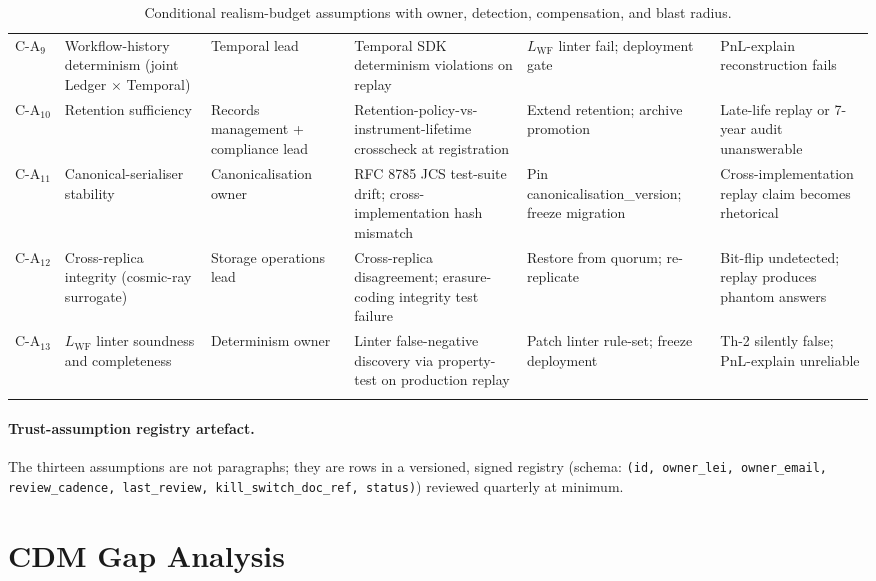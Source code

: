 \documentclass[11pt,a4paper]{article}
\begin{document}
\begin{center}
\begin{longtable}{@{}p{1.2cm}p{3.4cm}p{2.6cm}p{3.6cm}p{2.6cm}p{2cm}@{}}
$\mathrm{C\textrm{-}A}_9$  & Workflow-history determinism (joint Ledger $\times$ Temporal) & Temporal lead & Temporal SDK determinism violations on replay & $L_{\mathrm{WF}}$ linter fail; deployment gate & PnL-explain reconstruction fails \\
$\mathrm{C\textrm{-}A}_{10}$ & Retention sufficiency & Records management + compliance lead & Retention-policy-vs-instrument-lifetime crosscheck at registration & Extend retention; archive promotion & Late-life replay or 7-year audit unanswerable \\
$\mathrm{C\textrm{-}A}_{11}$ & Canonical-serialiser stability & Canonicalisation owner & RFC 8785 JCS test-suite drift; cross-implementation hash mismatch & Pin canonicalisation\_version; freeze migration & Cross-implementation replay claim becomes rhetorical \\
$\mathrm{C\textrm{-}A}_{12}$ & Cross-replica integrity (cosmic-ray surrogate) & Storage operations lead & Cross-replica disagreement; erasure-coding integrity test failure & Restore from quorum; re-replicate & Bit-flip undetected; replay produces phantom answers \\
$\mathrm{C\textrm{-}A}_{13}$ & $L_{\mathrm{WF}}$ linter soundness and completeness & Determinism owner & Linter false-negative discovery via property-test on production replay & Patch linter rule-set; freeze deployment & Th-2 silently false; PnL-explain unreliable \\
\caption{Conditional realism-budget assumptions with owner, detection, compensation, and blast radius.}
\label{tab:realism-cond}
\end{longtable}
\end{center}

\paragraph{Trust-assumption registry artefact.} The thirteen assumptions are not paragraphs; they are rows in a versioned, signed registry (schema: \texttt{(id, owner\_lei, owner\_email, review\_cadence, last\_review, kill\_switch\_doc\_ref, status)}) reviewed quarterly at minimum.

\clearpage
\section{CDM Gap Analysis}
\label{sec:cdm-gap}
\end{document}
